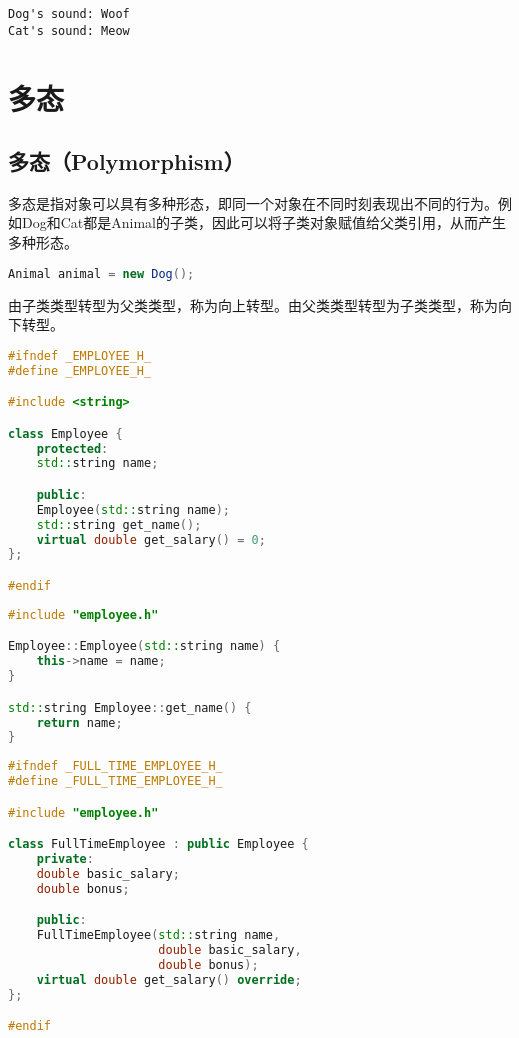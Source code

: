 \begin{tcolorbox}
    \begin{verbatim}
Dog's sound: Woof
Cat's sound: Meow
	\end{verbatim}
\end{tcolorbox}

\newpage

\section{多态}

\subsection{多态（Polymorphism）}

多态是指对象可以具有多种形态，即同一个对象在不同时刻表现出不同的行为。例如Dog和Cat都是Animal的子类，因此可以将子类对象赋值给父类引用，从而产生多种形态。

\vspace{-0.5cm}

\begin{lstlisting}[language=Java]
Animal animal = new Dog();
\end{lstlisting}

由子类类型转型为父类类型，称为向上转型。由父类类型转型为子类类型，称为向下转型。\\


\begin{lstlisting}[language=C++]
#ifndef _EMPLOYEE_H_
#define _EMPLOYEE_H_

#include <string>

class Employee {
    protected:
    std::string name;

    public:
    Employee(std::string name);
    std::string get_name();
    virtual double get_salary() = 0;
};

#endif
\end{lstlisting}

\begin{lstlisting}[language=C++]
#include "employee.h"

Employee::Employee(std::string name) {
    this->name = name;
}

std::string Employee::get_name() {
    return name;
}
\end{lstlisting}

\begin{lstlisting}[language=C++]
#ifndef _FULL_TIME_EMPLOYEE_H_
#define _FULL_TIME_EMPLOYEE_H_

#include "employee.h"

class FullTimeEmployee : public Employee {
    private:
    double basic_salary;
    double bonus;

    public:
    FullTimeEmployee(std::string name,
                     double basic_salary,
                     double bonus);
    virtual double get_salary() override;
};

#endif
\end{lstlisting}

